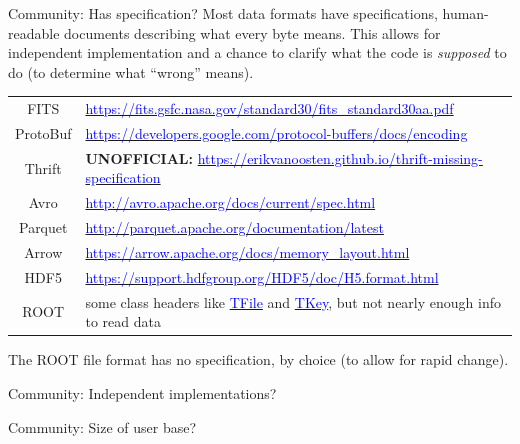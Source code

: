 \documentclass[aspectratio=169]{beamer}
\begin{document}
\begin{frame}{Community: Has specification?}
\vspace{0.5 cm}
Most data formats have specifications, human-readable documents describing what every byte means. This allows for independent implementation and a chance to clarify what the code is {\it supposed} to do (to determine what ``wrong'' means).

\vspace{0.25 cm}
\renewcommand{\arraystretch}{1.2}
\begin{tabular}{c l}
FITS & \href{https://fits.gsfc.nasa.gov/standard30/fits_standard30aa.pdf}{\textcolor{blue}{\small https://fits.gsfc.nasa.gov/standard30/fits\_standard30aa.pdf}} \\

ProtoBuf & \href{https://developers.google.com/protocol-buffers/docs/encoding}{\textcolor{blue}{\small https://developers.google.com/protocol-buffers/docs/encoding}} \\

Thrift & {\small {\bf UNOFFICIAL:} \href{https://erikvanoosten.github.io/thrift-missing-specification}{\textcolor{blue}{\small https://erikvanoosten.github.io/thrift-missing-specification}}} \\

Avro & \href{http://avro.apache.org/docs/current/spec.html}{\textcolor{blue}{\small http://avro.apache.org/docs/current/spec.html}} \\

Parquet & \href{http://parquet.apache.org/documentation/latest}{\textcolor{blue}{\small http://parquet.apache.org/documentation/latest}} \\

Arrow & \href{https://arrow.apache.org/docs/memory_layout.html}{\textcolor{blue}{\small https://arrow.apache.org/docs/memory\_layout.html}} \\

HDF5 & \href{https://support.hdfgroup.org/HDF5/doc/H5.format.html}{\textcolor{blue}{\small https://support.hdfgroup.org/HDF5/doc/H5.format.html}} \\

ROOT & {\small some class headers like \href{https://root.cern.ch/doc/master/classTFile.html}{\textcolor{blue}{TFile}} and \href{https://root.cern.ch/doc/master/classTKey.html}{\textcolor{blue}{TKey}}, but not nearly enough info to read data} \\
\end{tabular}

\vspace{0.25 cm}
The ROOT file format has no specification, by choice (to allow for rapid change).
\end{frame}

\begin{frame}{Community: Independent implementations?}
\vspace{0.5 cm}
\end{frame}

\begin{frame}{Community: Size of user base?}
\vspace{0.5 cm}
\end{frame}
\end{document}

